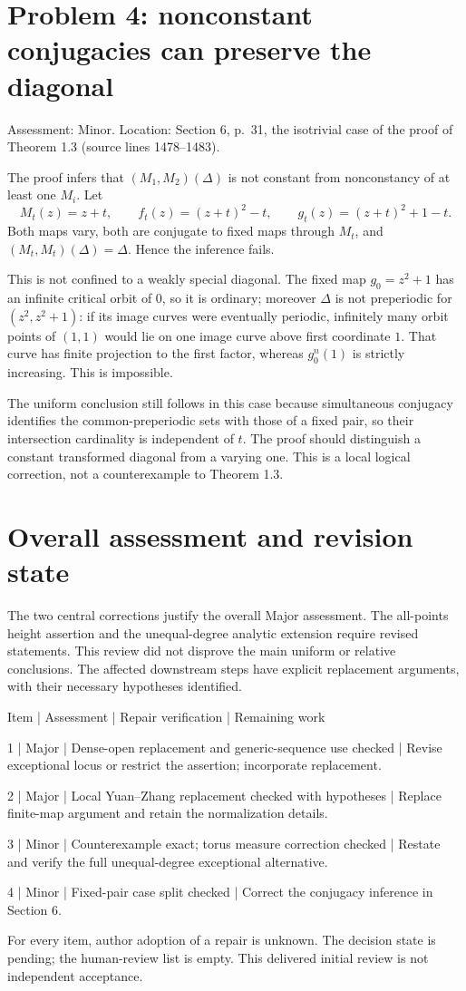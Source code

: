 \documentclass[10pt]{article}
\begin{document}
\section*{Problem 4: nonconstant conjugacies can preserve the diagonal}
Assessment: Minor. Location: Section 6, p. 31, the isotrivial case of the proof of Theorem 1.3 (source lines 1478–1483).\par
The proof infers that \((M_1,M_2)(\Delta)\) is not constant from nonconstancy of at least one \(M_i\). Let \[M_t(z)=z+t,\qquad f_t(z)=(z+t)^2-t,\qquad
 g_t(z)=(z+t)^2+1-t.\] Both maps vary, both are conjugate to fixed maps through \(M_t\), and \((M_t,M_t)(\Delta)=\Delta\). Hence the inference fails.\par
This is not confined to a weakly special diagonal. The fixed map \(g_0=z^2+1\) has an infinite critical orbit of \(0\), so it is ordinary; moreover \(\Delta\) is not preperiodic for \((z^2,z^2+1)\): if its image curves were eventually periodic, infinitely many orbit points of \((1,1)\) would lie on one image curve above first coordinate \(1\). That curve has finite projection to the first factor, whereas \(g_0^n(1)\) is strictly increasing. This is impossible.\par
The uniform conclusion still follows in this case because simultaneous conjugacy identifies the common-preperiodic sets with those of a fixed pair, so their intersection cardinality is independent of \(t\). The proof should distinguish a constant transformed diagonal from a varying one. This is a local logical correction, not a counterexample to Theorem 1.3.\par
\section*{Overall assessment and revision state}
The two central corrections justify the overall Major assessment. The all-points height assertion and the unequal-degree analytic extension require revised statements. This review did not disprove the main uniform or relative conclusions. The affected downstream steps have explicit replacement arguments, with their necessary hypotheses identified.\par
Item | Assessment | Repair verification | Remaining work\par
1 | Major | Dense-open replacement and generic-sequence use checked | Revise exceptional locus or restrict the assertion; incorporate replacement.\par
2 | Major | Local Yuan–Zhang replacement checked with hypotheses | Replace finite-map argument and retain the normalization details.\par
3 | Minor | Counterexample exact; torus measure correction checked | Restate and verify the full unequal-degree exceptional alternative.\par
4 | Minor | Fixed-pair case split checked | Correct the conjugacy inference in Section 6.\par
For every item, author adoption of a repair is unknown. The decision state is pending; the human-review list is empty. This delivered initial review is not independent acceptance.\par
\end{document}
